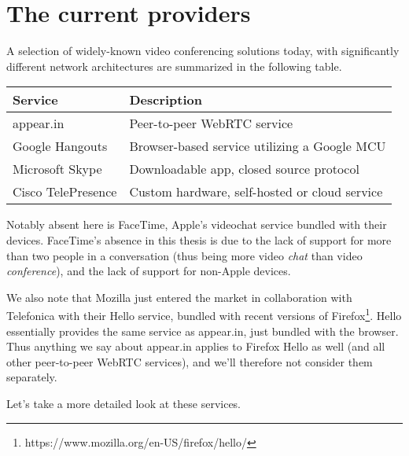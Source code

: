 


\section{The current providers}

A selection of widely-known video conferencing solutions today, with significantly different network architectures are summarized in the following table.

\begin{center}
	\label{tab:existing-solutions}
	\begin{tabular}{| l | l |}
		\hline
		\textbf{Service} & \textbf{Description} \\ \hline
		appear.in & Peer-to-peer WebRTC service \\ \hline
		Google Hangouts & Browser-based service utilizing a Google MCU \\ \hline
		Microsoft Skype & Downloadable app, closed source protocol \\ \hline
		Cisco TelePresence & Custom hardware, self-hosted or cloud service \\ \hline
	\end{tabular}
\end{center}

Notably absent here is FaceTime, Apple's videochat service bundled with their devices. FaceTime's absence in this thesis is due to the lack of support for more than two people in a conversation (thus being more video \emph{chat} than video \emph{conference}), and the lack of support for non-Apple devices.

We also note that Mozilla just entered the market in collaboration with Telefonica with their Hello service, bundled with recent versions of Firefox\footnote{https://www.mozilla.org/en-US/firefox/hello/}. Hello essentially provides the same service as appear.in, just bundled with the browser. Thus anything we say about appear.in applies to Firefox Hello as well (and all other peer-to-peer WebRTC services), and we'll therefore not consider them separately.

Let's take a more detailed look at these services.

